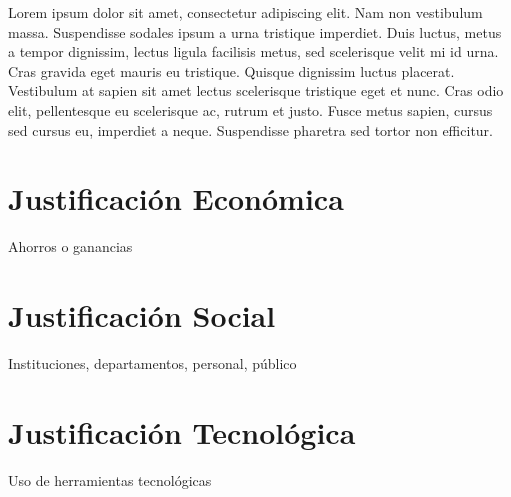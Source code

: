 Lorem ipsum dolor sit amet, consectetur adipiscing elit. Nam non vestibulum massa. Suspendisse sodales ipsum a urna tristique imperdiet. Duis luctus, metus a tempor dignissim, lectus ligula facilisis metus, sed scelerisque velit mi id urna. Cras gravida eget mauris eu tristique. Quisque dignissim luctus placerat. Vestibulum at sapien sit amet lectus scelerisque tristique eget et nunc. Cras odio elit, pellentesque eu scelerisque ac, rutrum et justo. Fusce metus sapien, cursus sed cursus eu, imperdiet a neque. Suspendisse pharetra sed tortor non efficitur.
\section{Justificación Económica}
Ahorros o ganancias
\section{Justificación Social}
Instituciones, departamentos, personal, público
\section{Justificación Tecnológica}
Uso de herramientas tecnológicas